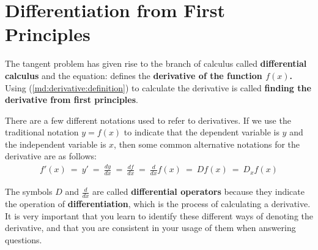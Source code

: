 \section{Differentiation from First Principles}
\label{md:derivatives}

The tangent problem has given rise to the branch of calculus called \textbf{differential calculus} and the equation:
defines the \textbf{derivative of the function $f(x)$.} Using (\ref{md:derivative:definition}) to calculate the derivative is called \textbf{finding the derivative from first principles}. 


There are a few different notations used to refer to derivatives. If we use the traditional notation $y=f(x)$ to indicate that the dependent variable is $y$ and the independent variable is $x$, then some common alternative notations for the derivative are as follows:
\begin{eqnarray*}
f'(x)\ =\ y'\ =\ \frac{dy}{dx}\ =\ \frac{df}{dx}\ =\ \frac{d}{dx}f(x)\ =\ Df(x)\ =\ D_{x}f(x)
\label{md:lim:not:eq}
\end{eqnarray*}

The symbols $D$ and $\frac{d}{dx}$ are called {\bf differential operators} because they indicate the operation of \textbf{differentiation}, which is the process of calculating a derivative. It is very important that you learn to identify these different ways of denoting the derivative, and that you are consistent in your usage of them when answering questions.

